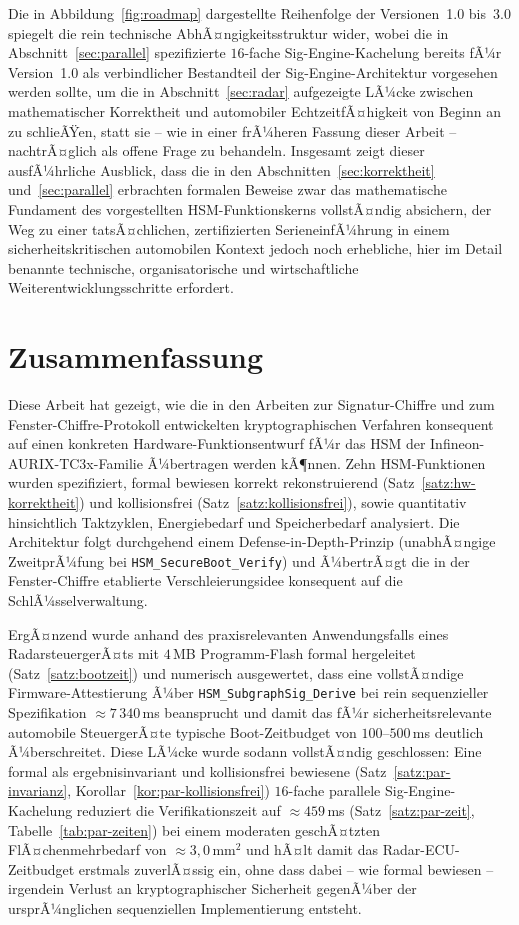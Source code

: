 ﻿\documentclass[a4paper,12pt]{article}
\theoremstyle{definition}
\begin{document}
Die in Abbildung~\ref{fig:roadmap} dargestellte Reihenfolge der Versionen~1.0 bis~3.0 spiegelt die rein technische AbhÃ¤ngigkeitsstruktur wider, wobei die in Abschnitt~\ref{sec:parallel} spezifizierte $16$-fache Sig-Engine-Kachelung bereits fÃ¼r Version~1.0 als verbindlicher Bestandteil der Sig-Engine-Architektur vorgesehen werden sollte, um die in Abschnitt~\ref{sec:radar} aufgezeigte LÃ¼cke zwischen mathematischer Korrektheit und automobiler EchtzeitfÃ¤higkeit von Beginn an zu schlieÃŸen, statt sie -- wie in einer frÃ¼heren Fassung dieser Arbeit -- nachtrÃ¤glich als offene Frage zu behandeln. Insgesamt zeigt dieser ausfÃ¼hrliche Ausblick, dass die in den Abschnitten~\ref{sec:korrektheit} und~\ref{sec:parallel} erbrachten formalen Beweise zwar das mathematische Fundament des vorgestellten HSM-Funktionskerns vollstÃ¤ndig absichern, der Weg zu einer tatsÃ¤chlichen, zertifizierten SerieneinfÃ¼hrung in einem sicherheitskritischen automobilen Kontext jedoch noch erhebliche, hier im Detail benannte technische, organisatorische und wirtschaftliche Weiterentwicklungsschritte erfordert.

\section{Zusammenfassung}

Diese Arbeit hat gezeigt, wie die in den Arbeiten zur Signatur-Chiffre \cite{Epp26b} und zum Fenster-Chiffre-Protokoll \cite{Epp26c} entwickelten kryptographischen Verfahren konsequent auf einen konkreten Hardware-Funktionsentwurf fÃ¼r das HSM der Infineon-AURIX-TC3x-Familie Ã¼bertragen werden kÃ¶nnen. Zehn HSM-Funktionen wurden spezifiziert, formal bewiesen korrekt rekonstruierend (Satz~\ref{satz:hw-korrektheit}) und kollisionsfrei (Satz~\ref{satz:kollisionsfrei}), sowie quantitativ hinsichtlich Taktzyklen, Energiebedarf und Speicherbedarf analysiert. Die Architektur folgt durchgehend einem Defense-in-Depth-Prinzip (unabhÃ¤ngige ZweitprÃ¼fung bei \texttt{HSM\_SecureBoot\_Verify}) und Ã¼bertrÃ¤gt die in der Fenster-Chiffre etablierte Verschleierungsidee konsequent auf die SchlÃ¼sselverwaltung.

ErgÃ¤nzend wurde anhand des praxisrelevanten Anwendungsfalls eines RadarsteuergerÃ¤ts mit $4$\,MB Programm-Flash formal hergeleitet (Satz~\ref{satz:bootzeit}) und numerisch ausgewertet, dass eine vollstÃ¤ndige Firmware-Attestierung Ã¼ber \texttt{HSM\_SubgraphSig\_Derive} bei rein sequenzieller Spezifikation $\approx 7\,340$\,ms beansprucht und damit das fÃ¼r sicherheitsrelevante automobile SteuergerÃ¤te typische Boot-Zeitbudget von $100$--$500$\,ms deutlich Ã¼berschreitet. Diese LÃ¼cke wurde sodann vollstÃ¤ndig geschlossen: Eine formal als ergebnisinvariant und kollisionsfrei bewiesene (Satz~\ref{satz:par-invarianz}, Korollar~\ref{kor:par-kollisionsfrei}) $16$-fache parallele Sig-Engine-Kachelung reduziert die Verifikationszeit auf $\approx 459$\,ms (Satz~\ref{satz:par-zeit}, Tabelle~\ref{tab:par-zeiten}) bei einem moderaten geschÃ¤tzten FlÃ¤chenmehrbedarf von $\approx 3{,}0\,\mathrm{mm}^2$ und hÃ¤lt damit das Radar-ECU-Zeitbudget erstmals zuverlÃ¤ssig ein, ohne dass dabei -- wie formal bewiesen -- irgendein Verlust an kryptographischer Sicherheit gegenÃ¼ber der ursprÃ¼nglichen sequenziellen Implementierung entsteht.
\end{document}
